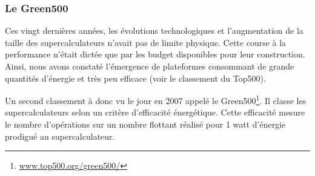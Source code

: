        \begin{table}[]
\centering
{}
\caption{Classement du Top500 de novembre 2019. Les puissances Rpeak (puissance théorique) et Rmax (puissance mesurée par HPL) sont données en PFlops ($10^{15}$ flops)}
\label{tab:top500}
\end{table}
   
   
    
    \subsubsection{Le Green500}
    
        Ces vingt dernières années, les évolutions technologiques et l'augmentation de la taille des supercalculateurs n'avait pas de limite physique. Cette course à la performance n'était dictée que par les budget disponibles pour leur construction. Ainsi, nous avons constaté l'émergence de plateformes consommant de grande quantités d'énergie et très peu efficace (voir le classement du Top500). 
        
        Un second classement à donc vu le jour en 2007 appelé le Green500\footnote{\url{www.top500.org/green500/}}. Il classe les supercalculateurs selon un critère d’efficacité énergétique. Cette efficacité mesure le nombre d’opérations sur un nombre flottant réalisé pour 1 watt d’énergie prodigué au supercalculateur. 
        
